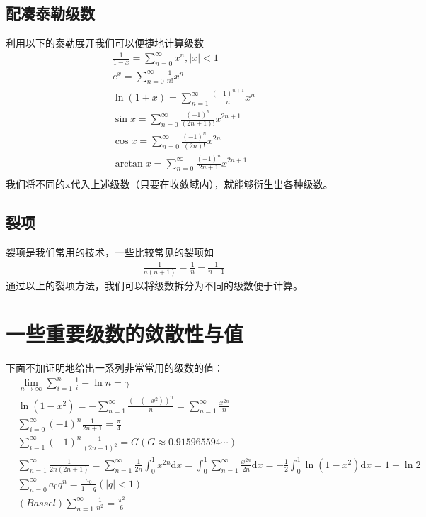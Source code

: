 \documentclass[12pt,a4paper,UTF8]{ctexbook}
\theoremstyle{plain}
\begin{document}
\subsection{配凑泰勒级数}
利用以下的泰勒展开我们可以便捷地计算级数
\begin{align*} 
    & \frac{1}{1-x}=\sum_{n=0}^\infty x^n,|x|<1&\\
    &e^x = \sum_{n=0}^\infty \frac{1}{n!}x^n&\\
    &\ln(1+x)=\sum_{n=1}^\infty \frac{(-1)^{n+1}}{n}x^n&\\
    &\sin x= \sum_{n=0}^\infty \frac{(-1)^{n}}{(2n+1)!} x^{2n+1}&\\
    &\cos x= \sum_{n=0}^\infty \frac{(-1)^{n}}{(2n)!} x^{2n}&\\
    &\arctan x= \sum_{n=0}^\infty \frac{(-1)^n}{2n+1}x^{2n+1}&\\
\end{align*}
我们将不同的x代入上述级数（只要在收敛域内），就能够衍生出各种级数。
\subsection{裂项}
裂项是我们常用的技术，一些比较常见的裂项如
\begin{align*} 
    \frac{1}{n(n+1)}=\frac{1}{n}-\frac{1}{n+1}
\end{align*}
通过以上的裂项方法，我们可以将级数拆分为不同的级数便于计算。
\section{一些重要级数的敛散性与值}
下面不加证明地给出一系列非常常用的级数的值：
\begin{align*}
    & \lim_{n\to \infty}\sum_{i=1}^n\frac{1}{i}-\ln n=\gamma &\\
    & \ln(1-x^2)=-\sum_{n=1}^\infty\frac{(-(-x^2))^n}{n}=\sum_{n=1}^\infty\frac{x^{2n}}{n}&\\
    & \sum_{i=0}^\infty(-1)^n\frac{1}{2n+1}=\frac{\pi}{4} &\\
    & \sum_{i=1}^\infty(-1)^n\frac{1}{(2n+1)^2}=G(G\approx 0.915965594\cdots)&\\
    & \sum_{n=1}^\infty\frac{1}{2n(2n+1)}=\sum_{n=1}^\infty\frac{1}{2n}\int_{0}^1x^{2n}\mathrm d x=\int_0^1\sum_{n=1}^\infty\frac{x^{2n}}{2n}\mathrm d x=-\frac{1}{2}\int_0^1\ln(1-x^2)\mathrm d x=1-\ln 2&\\
    & \sum_{n=0}^\infty a_0q^{n}=\frac{a_0}{1-q}(|q|<1)&\\
    & (Bassel)\sum_{n=1}^\infty \frac{1}{n^2}=\frac{\pi^2}{6}&
\end{align*}
\end{document}

